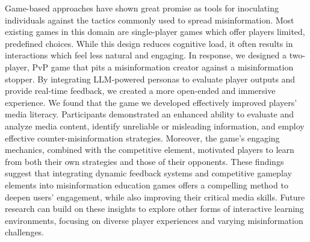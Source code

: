 Game-based approaches have shown great promise as tools for inoculating individuals against the tactics commonly used to spread misinformation. Most existing games in this domain are single-player games which offer players limited, predefined choices. While this design reduces cognitive load, it often results in interactions which feel less natural and engaging. In response, we designed a two-player, PvP game that pits a misinformation creator against a misinformation stopper. By integrating LLM-powered personas to evaluate player outputs and provide real-time feedback, we created a more open-ended and immersive experience.
We found that the game we developed effectively improved players’ media literacy. Participants demonstrated an enhanced ability to evaluate and analyze media content, identify unreliable or misleading information, and employ effective counter-misinformation strategies. Moreover, the game's engaging mechanics, combined with the competitive element, motivated players to learn from both their own strategies and those of their opponents.
These findings suggest that integrating dynamic feedback systems and competitive gameplay elements into misinformation education games offers a compelling method to deepen users' engagement, while also improving their critical media skills. Future research can build on these insights to explore other forms of interactive learning environments, focusing on diverse player experiences and varying misinformation challenges.